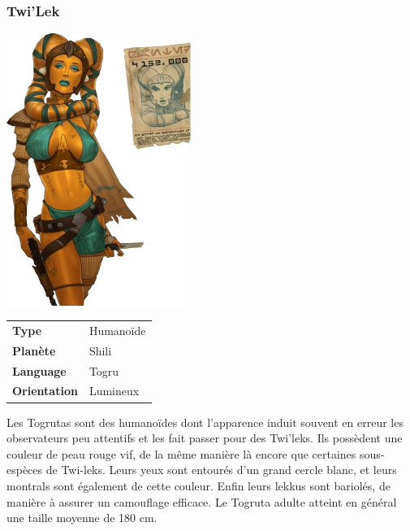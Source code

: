 \subsubsection{Twi'Lek}
\vspace{-1\baselineskip}
\includegraphics[width=6cm]{img/races/twilek.png}
\vspace{-5\baselineskip}
\begin{flushright}
\begin{tabular}{ l l }
	\textbf{Type} 			& Humanoïde \\
   	\textbf{Planète} 		& Shili \\
   	\textbf{Language} 		& Togru \\
   	\textbf{Orientation} 	& Lumineux \\
\end{tabular}
\end{flushright}


Les Togrutas sont des humanoïdes dont l'apparence induit souvent en erreur les observateurs peu attentifs et les fait passer pour des Twi'leks. Ils possèdent une couleur de peau rouge vif, de la même manière là encore que certaines sous-espèces de Twi-leks. Leurs yeux sont entourés d'un grand cercle blanc, et leurs montrals sont également de cette couleur. Enfin leurs lekkus sont bariolés, de manière à assurer un camouflage efficace. Le Togruta adulte atteint en général une taille moyenne de 180 cm. 


